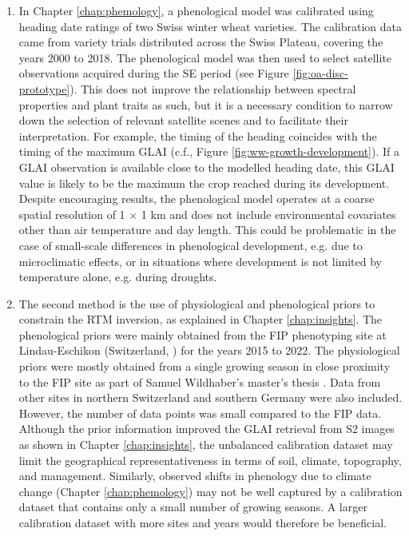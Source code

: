 \begin{enumerate}

\item In Chapter \ref{chap:phemology}, a phenological model was calibrated using heading date ratings of two Swiss winter wheat varieties. The calibration data came from variety trials distributed across the Swiss Plateau, covering the years 2000 to 2018. The phenological model was then used to select satellite observations acquired during the \gls{SE} period (see Figure \ref{fig:oa-disc-prototype}). This does not improve the relationship between spectral properties and plant traits as such, but it is a necessary condition to narrow down the selection of relevant satellite scenes and to facilitate their interpretation. For example, the timing of the heading coincides with the timing of the maximum \gls{GLAI} (c.f., Figure \ref{fig:ww-growth-development}). If a \gls{GLAI} observation is available close to the modelled heading date, this \gls{GLAI} value is likely to be the maximum the crop reached during its development. Despite encouraging results, the phenological model operates at a coarse spatial resolution of 1 $\times$ 1 km and does not include environmental covariates other than air temperature and day length. This could be problematic in the case of small-scale differences in phenological development, e.g. due to microclimatic effects, or in situations where development is not limited by temperature alone, e.g. during droughts.

\item The second method is the use of physiological and phenological priors to constrain the \gls{RTM} inversion, as explained in Chapter \ref{chap:insights}. The phenological priors were mainly obtained from the FIP phenotyping site at Lindau-Eschikon (Switzerland, \cite{kirchgessner_eth_2017}) for the years 2015 to 2022. The physiological priors were mostly obtained from a single growing season in close proximity to the FIP site as part of Samuel Wildhaber's master's thesis \citep{wildhaber_assessing_2023}. Data from other sites in northern Switzerland and southern Germany were also included. However, the number of data points was small compared to the FIP data. Although the prior information improved the \gls{GLAI} retrieval from \gls{S2} images as shown in Chapter \ref{chap:insights}, the unbalanced calibration dataset may limit the geographical representativeness in terms of soil, climate, topography, and management. Similarly, observed shifts in phenology due to climate change (Chapter \ref{chap:phemology}) may not be well captured by a calibration dataset that contains only a small number of growing seasons. A larger calibration dataset with more sites and years would therefore be beneficial.


\end{enumerate}
